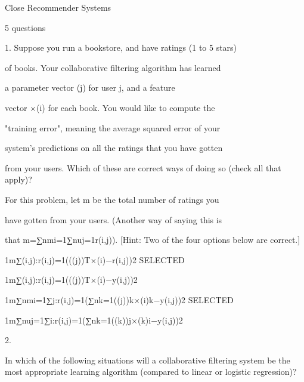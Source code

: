 Close
Recommender Systems

5 questions


1. 
Suppose you run a bookstore, and have ratings (1 to 5 stars)

of books. Your collaborative filtering algorithm has learned

a parameter vector \theta(j) for user j, and a feature

vector $ \times $(i) for each book. You would like to compute the

"training error", meaning the average squared error of your

system's predictions on all the ratings that you have gotten

from your users. Which of these are correct ways of doing so (check all that apply)?

For this problem, let m be the total number of ratings you

have gotten from your users. (Another way of saying this is

that m=∑nmi=1∑nuj=1r(i,j)). [Hint: Two of the four options below are correct.]


1m∑(i,j):r(i,j)=1((\theta(j))T$ \times $(i)−r(i,j))2 SELECTED

1m∑(i,j):r(i,j)=1((\theta(j))T$ \times $(i)−y(i,j))2

1m∑nmi=1∑j:r(i,j)=1(∑nk=1(\theta(j))k$ \times $(i)k−y(i,j))2 SELECTED

1m∑nuj=1∑i:r(i,j)=1(∑nk=1(\theta(k))j$ \times $(k)i−y(i,j))2


2. 

In which of the following situations will a collaborative filtering system be the most appropriate learning algorithm (compared to linear or logistic regression)?

